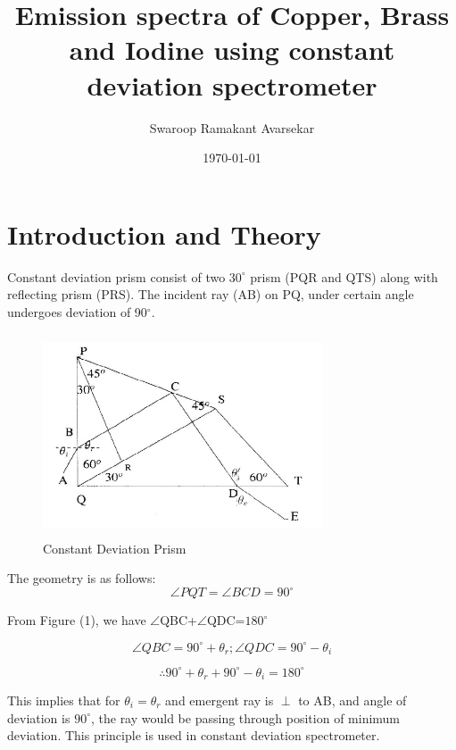 \documentclass[a4paper, amsfonts, amssymb, amsmath, reprint, showkeys, nofootinbib, twoside]{revtex4-1}
\begin{document}
\title{Emission spectra of Copper, Brass and Iodine using constant deviation spectrometer}
\author{Swaroop Ramakant Avarsekar}
\date{\today}

	
\begin{abstract}

\end{abstract}
	
\maketitle

\section{Introduction and Theory}
Constant deviation prism consist of two $30^{\circ}$ prism (PQR and QTS) along with reflecting prism (PRS). The incident ray (AB) on PQ, under certain angle undergoes deviation of 90$^\circ$. 

\begin{figure}[H] %
	\centering
	\includegraphics[width=8.3cm,height=6cm]{2} 
	\caption{Constant Deviation Prism}
	\label{1}
\end{figure}

The geometry is as follows:
$$ \angle PQT = \angle BCD=90^{\circ} $$

From Figure (1), we have $\angle$QBC+$\angle$QDC=$180 ^\circ$

$$\angle QBC =90 ^\circ + \theta_r  ;  \angle QDC =90 ^\circ-\theta_i$$

$$\therefore 90 ^\circ+\theta_r+90 ^\circ-\theta_i=180 ^\circ$$

This implies that for $\theta_i=\theta_r$ and emergent ray is $\perp$ to AB, and angle of deviation is $90^\circ$, the ray would be passing through position of minimum deviation. This principle is used in constant deviation spectrometer. 
\end{document}
